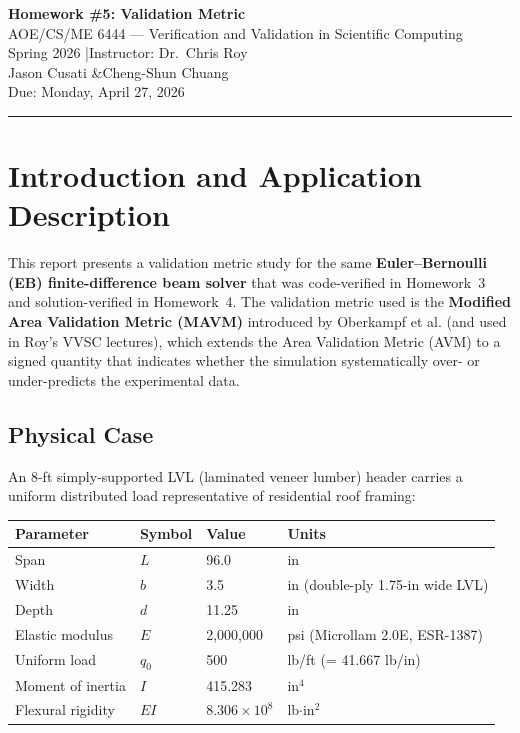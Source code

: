 \documentclass[11pt,letterpaper]{article}
\newcommand{\EI}{EI}
\begin{document}
\begin{center}
  {\LARGE\bfseries Homework \#5: Validation Metric}\\[6pt]
  {\large AOE/CS/ME 6444 — Verification and Validation in Scientific Computing}\\
  {\large Spring 2026 \quad|\quad Instructor: Dr.\ Chris Roy}\\[4pt]
  {\large Jason Cusati \quad\&\quad Cheng-Shun Chuang}\\[2pt]
  {\normalsize Due: Monday, April 27, 2026}
\end{center}
\vspace{6pt}
\hrule
\vspace{10pt}

\section{Introduction and Application Description}
\label{sec:intro}

This report presents a validation metric study for the same \textbf{Euler--Bernoulli
(EB) finite-difference beam solver} that was code-verified in Homework~3 and
solution-verified in Homework~4.  The validation metric used is the
\textbf{Modified Area Validation Metric (MAVM)} introduced by Oberkampf et al.
(and used in Roy's VVSC lectures), which extends the Area Validation Metric (AVM)
to a signed quantity that indicates whether the simulation systematically
over- or under-predicts the experimental data.

\subsection*{Physical Case}

An 8-ft simply-supported LVL (laminated veneer lumber) header carries a uniform
distributed load representative of residential roof framing:

\begin{center}
\begin{tabular}{llll}
  \toprule
  Parameter & Symbol & Value & Units \\
  \midrule
  Span              & $L$      & 96.0      & in \\
  Width             & $b$      & 3.5       & in (double-ply 1.75-in wide LVL) \\
  Depth             & $d$      & 11.25     & in \\
  Elastic modulus   & $E$      & 2,000,000 & psi (Microllam 2.0E, ESR-1387) \\
  Uniform load      & $q_0$    & 500       & lb/ft (= 41.667 lb/in) \\
  Moment of inertia & $I$      & 415.283   & in$^4$ \\
  Flexural rigidity & $\EI$    & $8.306\times10^8$ & lb$\cdot$in$^2$ \\
  \bottomrule
\end{tabular}
\end{center}
\end{document}
